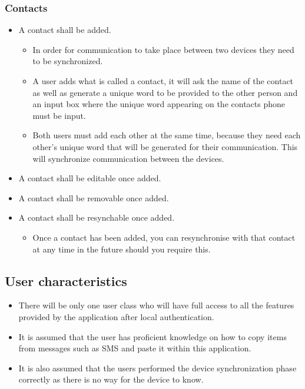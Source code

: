 \subsubsection{Contacts}
\begin{itemize}
\item A contact shall be added.
\begin{itemize}
\item In order for communication to take place between two devices they need to be synchronized.
\item A user adds what is called a contact, it will ask the name of the contact as well as generate a unique word to be provided to the other person and an input box where the unique word appearing on the contacts phone must be input.
\item Both users must add each other at the same time, because they need each other's unique word that will be generated for their communication. This will synchronize communication between the devices.
\end{itemize}
\item A contact shall be editable once added.
\item A contact shall be removable once added.
\item A contact shall be resynchable once added.
\begin{itemize}
\item Once a contact has been added, you can resynchronise with that contact at any time in the future should you require this.
\end{itemize}
\end{itemize}

\subsection{User characteristics}
\begin{itemize}
\item There will be only one user class who will have full access to all the features provided by the application after local authentication.
\item It is assumed that the user has proficient knowledge on how to copy items from messages such as SMS and paste it within this application.
\item It is also assumed that the users performed the device synchronization phase correctly as there is no way for the device to know.
\end{itemize}


